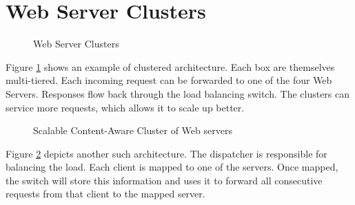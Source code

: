 \documentclass[twoside]{article}
\begin{document}
\section{Web Server Clusters}
\begin{figure}[h]
\begin{center}
\caption{Web Server Clusters}
\label{cluster_1}
\end{center}
\end{figure}
Figure \ref{cluster_1} shows an example of clustered architecture. Each box are themselves multi-tiered. Each incoming request can be forwarded to one of the four Web Servers. Responses flow back through the load balancing switch. The clusters can service more requests, which allows it to scale up better.\\
\begin{figure}[h]
\begin{center}
\caption{Scalable Content-Aware Cluster of Web servers}
\label{cluster_2}
\end{center}
\end{figure}
Figure \ref{cluster_2} depicts another such architecture. The dispatcher is responsible for balancing the load. Each client is mapped to one of the servers. Once mapped, the switch will store this information and uses it to forward all consecutive requests from that client to the mapped server.\\\\
\end{document}
